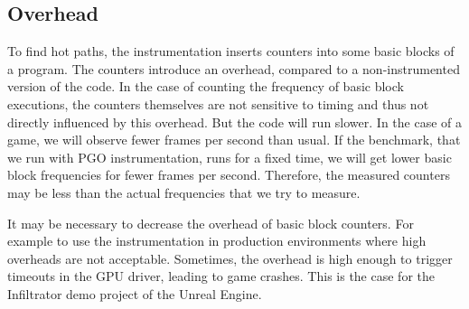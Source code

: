 \subsection{Overhead}
\label{sub:overhead}
To find hot paths, the instrumentation inserts counters into some basic blocks of a program. The counters introduce an overhead, compared to a non-instrumented version of the code.
In the case of counting the frequency of basic block executions, the counters themselves are not sensitive to timing and thus not directly influenced by this overhead.
But the code will run slower. In the case of a game, we will observe fewer frames per second than usual.
If the benchmark, that we run with PGO instrumentation, runs for a fixed time, we will get lower basic block frequencies for fewer frames per second.
Therefore, the measured counters may be less than the actual frequencies that we try to measure.

\begin{figure}
\pgfplotsset{width=\textwidth*0.75}
\centering
{}
\label{dia:overhead}
\end{figure}

It may be necessary to decrease the overhead of basic block counters. For example to use the instrumentation in production environments where high overheads are not acceptable.
Sometimes, the overhead is high enough to trigger timeouts in the GPU driver, leading to game crashes. This is the case for the Infiltrator demo project of the Unreal Engine.

